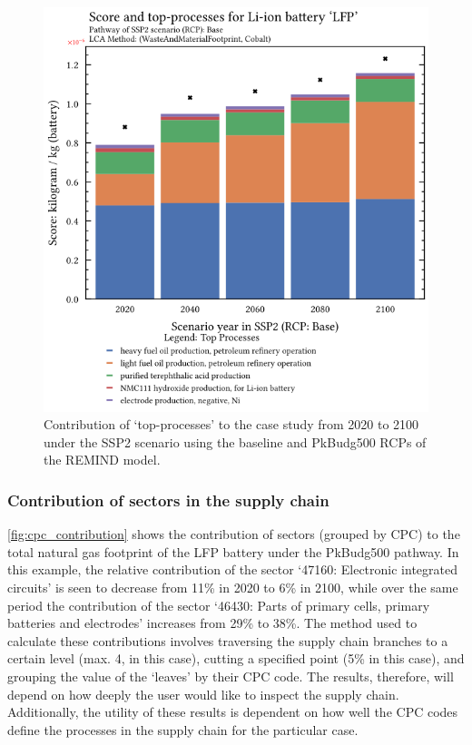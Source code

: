 \begin{figure}[H]
    \centering
    \includegraphics[width=0.6\linewidth]{figures/top-processes.png}
    \caption{Contribution of `top-processes' to the case study from 2020 to 2100 under the SSP2 scenario using the baseline and PkBudg500 RCPs of the REMIND model.}\label{fig:top_contribution}
\end{figure}

\subsubsection{Contribution of sectors in the supply chain}\label{sec:results-case_study-topsectors}

\autoref{fig:cpc_contribution} shows the contribution of sectors (grouped by CPC) to the total natural gas footprint of the LFP battery under the PkBudg500 pathway. In this example, the relative contribution of the sector `47160: Electronic integrated circuits' is seen to decrease from 11\% in 2020 to 6\% in 2100, while over the same period the contribution of the sector `46430: Parts of primary cells, primary batteries and electrodes' increases from 29\% to 38\%. The method used to calculate these contributions involves traversing the supply chain branches to a certain level (max. 4, in this case), cutting a specified point (5\% in this case), and grouping the value of the `leaves' by their CPC code. The results, therefore, will depend on how deeply the user would like to inspect the supply chain. Additionally, the utility of these results is dependent on how well the CPC codes define the processes in the supply chain for the particular case. 

